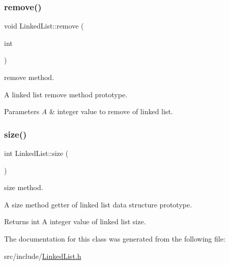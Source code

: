\subsubsection{\texorpdfstring{remove()}{remove()}}
{\footnotesize\ttfamily void Linked\+List\+::remove (\begin{DoxyParamCaption}\item[{int}]{ }\end{DoxyParamCaption})}



remove method. 

A linked list remove method prototype.


\begin{DoxyParams}{Parameters}
{\em A} & integer value to remove of linked list. \\
\hline
\end{DoxyParams}
\mbox{\label{classLinkedList_a4224bd8bf5f18b7b6f9fa66ee2c35702}} 
\subsubsection{\texorpdfstring{size()}{size()}}
{\footnotesize\ttfamily int Linked\+List\+::size (\begin{DoxyParamCaption}{ }\end{DoxyParamCaption})\hspace{0.3cm}{\ttfamily [inline]}}



size method. 

A size method getter of linked list data structure prototype.

\begin{DoxyReturn}{Returns}
int A integer value of linked list size. 
\end{DoxyReturn}


The documentation for this class was generated from the following file\+:\begin{DoxyCompactItemize}
\item 
src/include/\hyperlink{LinkedList_8h}{Linked\+List.\+h}\end{DoxyCompactItemize}
